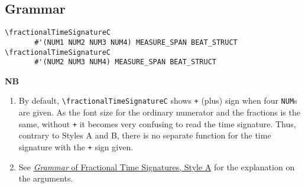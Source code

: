 \subsection{Grammar}
\begin{verbatim}
\fractionalTimeSignatureC 
       #'(NUM1 NUM2 NUM3 NUM4) MEASURE_SPAN BEAT_STRUCT
\fractionalTimeSignatureC 
       #'(NUM2 NUM3 NUM4) MEASURE_SPAN BEAT_STRUCT
\end{verbatim}
\textbf{NB} 
\begin{enumerate}
\item By default, \verb|\fractionalTimeSignatureC| shows \verb|+| (plus) sign when four \verb|NUM|s are given. As the font size for the ordinary numerator and the fractions is the same, without \verb|+| it becomes very confusing to read the time signature. Thus, contrary to Styles A and B, there is no separate function for the time signature with the \verb|+| sign given.
\item See \hyperref[sec:time_signatures_styleA_convention]{\textit{Grammar} of Fractional Time Signatures, Style A} for the explanation on the arguments.
\end{enumerate}
